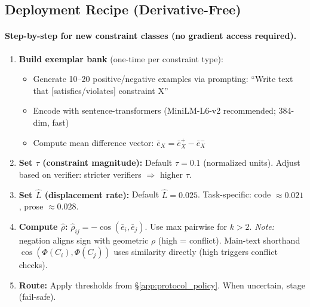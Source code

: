 \documentclass{article}
\theoremstyle{plain}
\theoremstyle{definition}
\theoremstyle{remark}
\newcommand{\rhohat}{\hat{\rho}}
\begin{document}
\subsection{Deployment Recipe (Derivative-Free)}\label{app:deployment}

\paragraph{Step-by-step for new constraint classes (no gradient access required).}
\begin{enumerate}[nosep,leftmargin=*]
\item \textbf{Build exemplar bank} (one-time per constraint type):
  \begin{itemize}[nosep]
  \item Generate 10--20 positive/negative examples via prompting: ``Write text that [satisfies/violates] constraint X''
  \item Encode with sentence-transformers (MiniLM-L6-v2 recommended; 384-dim, fast)
  \item Compute mean difference vector: $\bar{e}_X = \bar{e}^+_X - \bar{e}^-_X$
  \end{itemize}
\item \textbf{Set $\tau$ (constraint magnitude):} Default $\tau = 0.1$ (normalized units). Adjust based on verifier: stricter verifiers $\Rightarrow$ higher $\tau$.
\item \textbf{Set $\hat{L}$ (displacement rate):} Default $\hat{L} = 0.025$. Task-specific: code $\approx 0.021$, prose $\approx 0.028$.
\item \textbf{Compute $\rhohat$:} $\rhohat_{ij} = -\cos(\bar{e}_i, \bar{e}_j)$. Use max pairwise for $k > 2$. \emph{Note:} negation aligns sign with geometric $\rho$ (high = conflict). Main-text shorthand $\cos(\Phi(C_i), \Phi(C_j))$ uses similarity directly (high triggers conflict checks).
\item \textbf{Route:} Apply thresholds from \S\ref{app:protocol_policy}. When uncertain, stage (fail-safe).
\end{enumerate}
\end{document}
